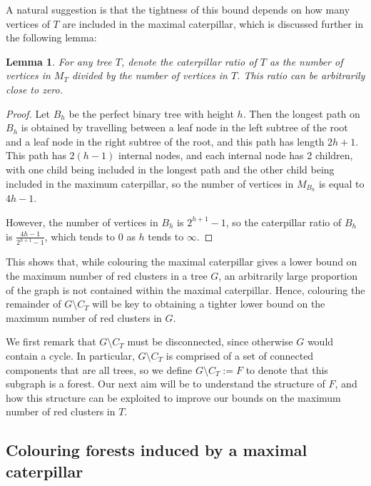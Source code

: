 \documentclass{mpaper}
\newtheorem{lemma}[theorem]{Lemma}
\begin{document}
A natural suggestion is that the tightness of this bound depends on how many vertices of $T$ are included in the maximal caterpillar, which is discussed further in the following lemma:

\begin{lemma}
  \label{lem/ratio-tends-to-zero}
  For any tree $T$, denote the \emph{caterpillar ratio of $T$} as the number of vertices in $M_T$ divided by the number of vertices in $T$. This ratio can be arbitrarily close to zero.
\end{lemma}

\begin{proof}
Let $B_h$ be the perfect binary tree with height $h$. Then the longest path on $B_h$ is obtained by travelling between a leaf node in the left subtree of the root and a leaf node in the right subtree of the root, and this path has length $2h+1$. This path has $2(h-1)$ internal nodes, and each internal node has 2 children, with one child being included in the longest path and the other child being included in the maximum caterpillar, so the number of vertices in $M_{B_h}$ is equal to $4h-1$.

However, the number of vertices in $B_h$ is $2^{h+1}-1$, so the caterpillar ratio of $B_h$ is $\frac{4h-1}{2^{h+1}-1}$, which tends to $0$ as $h$ tends to $\infty$.
\end{proof}


This shows that, while colouring the maximal caterpillar gives a lower bound on the maximum number of red clusters in a tree $G$, an arbitrarily large proportion of the graph is not contained within the maximal caterpillar. Hence, colouring the remainder of $G \setminus C_T$ will be key to obtaining a tighter lower bound on the maximum number of red clusters in $G$.

We first remark that $G \setminus C_T$ must be disconnected, since otherwise $G$ would contain a cycle. In particular, $G \setminus C_T$ is comprised of a set of connected components that are all trees, so we define $G \setminus C_T := F$ to denote that this subgraph is a forest. Our next aim will be to understand the structure of $F$, and how this structure can be exploited to improve our bounds on the maximum number of red clusters in $T$.

\subsection{Colouring forests induced by a maximal caterpillar}
\label{sub/colouring_forests}
\end{document}
